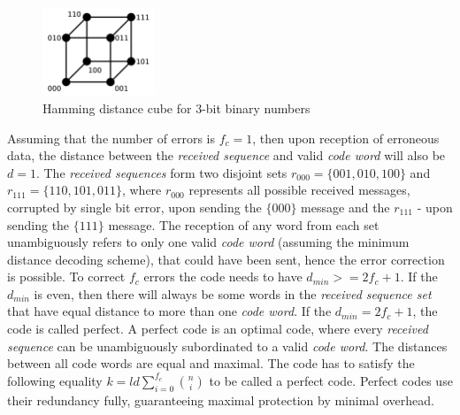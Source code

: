 \begin{figure}[H]
\centering
\includegraphics[width=0.3\textwidth]{figures/Hamming_distance.png}
\caption{Hamming distance cube for 3-bit binary numbers~\cite{web:hamming_dist}}
\label{fig:hamming_dist}
\end{figure}

Assuming that the number of errors is $f_c = 1$, then upon reception of erroneous data, the distance between the \textit{received sequence} and valid \textit{code word} will also be $d = 1$. The \textit{received sequences} form two disjoint sets $r_{000}=\{001,010,100\}$ and $r_{111}=\{110,101,011\}$, where $r_{000}$ represents all possible received messages, corrupted by single bit error, upon sending the $\{000\}$ message and the $r_{111}$ - upon sending the $\{111\}$ message. The reception of any word from each set unambiguously refers to only one valid \textit{code word} (assuming the minimum distance decoding scheme), that could have been sent, hence the error correction is possible. To correct $f_c$ errors the code needs to have $d_{min} >= 2f_c+1$. If the $d_{min}$ is even, then there will always be some words in the \textit{received sequence set} that have equal distance to more than one \textit{code word}. If the $d_{min} = 2f_c+1$, the code is called perfect. A perfect code is an optimal code, where every \textit{received sequence} can be unambiguously subordinated to a valid \textit{code word}. The distances between all code words are equal and maximal. The code has to satisfy the following equality $k=ld\sum_{i=0}^{f_c} \binom{n}{i}$ to be called a perfect code. Perfect codes use their redundancy fully, guaranteeing maximal protection by minimal overhead.

